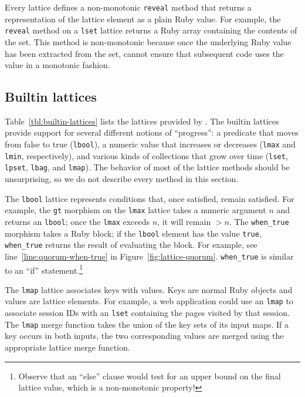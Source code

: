 Every lattice defines a non-monotonic \texttt{reveal} method that returns a
representation of the lattice element as a plain Ruby value. For example, the
\texttt{reveal} method on a \texttt{lset} lattice returns a Ruby array
containing the contents of the set. This method is non-monotonic because once the
underlying Ruby value has been extracted from the set, \lang cannot ensure that
subsequent code uses the value in a monotonic fashion.

\subsection{Builtin lattices}
\label{sec:lattice-builtins}

Table~\ref{tbl:builtin-lattices} lists the lattices provided by \lang. The
builtin lattices provide support for several different notions of ``progress'':
a predicate that moves from false to true (\texttt{lbool}), a numeric value that
increases or decreases (\texttt{lmax} and \texttt{lmin}, respectively), and
various kinds of collections that grow over time (\texttt{lset}, \texttt{lpset},
\texttt{lbag}, and \texttt{lmap}). The behavior of most of the lattice methods
should be unsurprising, so we do not describe every method in this section.

The \texttt{lbool} lattice represents conditions that, once satisfied, remain
satisfied. For example, the \texttt{gt} morphism on the \texttt{lmax} lattice
takes a numeric argument $n$ and returns an \texttt{lbool}; once the
\texttt{lmax} exceeds $n$, it will remain $>n$. The \texttt{when\_true} morphism
takes a Ruby block; if the \texttt{lbool} element has the value \texttt{true},
\texttt{when\_true} returns the result of evaluating the block. For example, see
line~\ref{line:quorum-when-true} in
Figure~\ref{fig:lattice-quorum}. \texttt{when\_true} is similar to an ``if''
statement.\footnote{Observe that an ``else'' clause would test for an upper
  bound on the final lattice value, which is a non-monotonic property!}

The \texttt{lmap} lattice associates keys with values. Keys are normal Ruby
objects and values are lattice elements. For example, a web application could
use an \texttt{lmap} to associate session IDs with an \texttt{lset} containing
the pages visited by that session. The \texttt{lmap} merge function takes the
union of the key sets of its input maps. If a key occurs in both inputs, the two
corresponding values are merged using the appropriate lattice merge function.

